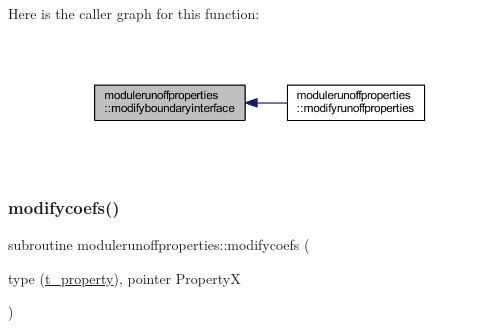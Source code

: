 Here is the caller graph for this function\+:\nopagebreak
\begin{figure}[H]
\begin{center}
\leavevmode
\includegraphics[width=350pt]{namespacemodulerunoffproperties_abb21b8b2577c08fe41a7a41e186272d5_icgraph}
\end{center}
\end{figure}
\mbox{\label{namespacemodulerunoffproperties_ab43247d321857ac09aa5d9ef97891cd1}} 
\subsubsection{\texorpdfstring{modifycoefs()}{modifycoefs()}}
{\footnotesize\ttfamily subroutine modulerunoffproperties\+::modifycoefs (\begin{DoxyParamCaption}\item[{type (\mbox{\hyperlink{structmodulerunoffproperties_1_1t__property}{t\+\_\+property}}), pointer}]{PropertyX }\end{DoxyParamCaption})\hspace{0.3cm}{\ttfamily [private]}}

